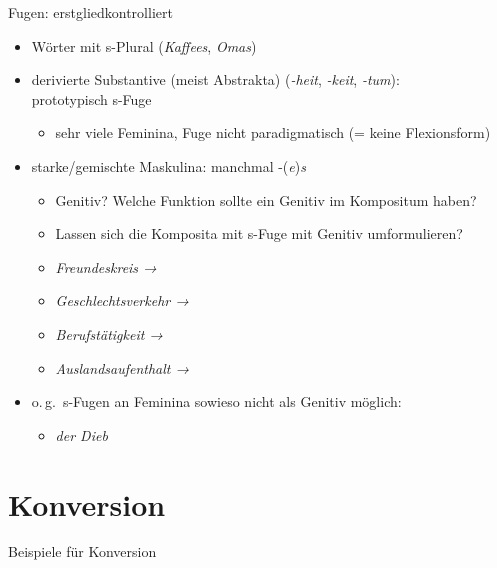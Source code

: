 \begin{frame}
  {Fugen: erstgliedkontrolliert}
  \pause
  \begin{itemize}[<+->]
    \item Wörter mit s-Plural (\textit{Kaffees}, \textit{Omas}) 
      \Halbzeile
    \item \alert{derivierte} Substantive (meist Abstrakta) (\textit{-heit}, \textit{-keit}, \textit{-tum}):\\
      \alert{prototypisch s-Fuge}
      \begin{itemize}[<+->]
        \item sehr viele Feminina, Fuge nicht paradigmatisch (= keine Flexionsform)
      \end{itemize}
      \Halbzeile
    \item starke\slash gemischte Maskulina: manchmal -(\textit{e})\textit{s}
      \begin{itemize}[<+->]
        \item Genitiv? Welche Funktion sollte ein Genitiv im Kompositum haben?
        \item Lassen sich die Komposita mit s-Fuge mit Genitiv umformulieren?
        \item \textit{Freundeskreis → }
        \item \textit{Geschlechtsverkehr → }
        \item \textit{Berufstätigkeit → }
        \item \textit{Auslandsaufenthalt → }
      \end{itemize}
    \Halbzeile
  \item o.\,g.\ s-Fugen an \alert{Feminina} sowieso nicht als Genitiv möglich:
      \begin{itemize}
        \item \textit{der Dieb }
      \end{itemize}
  \end{itemize}
\end{frame}

\section{Konversion}

\begin{frame}
  {Beispiele für Konversion}
  \pause
  \begin{exe}
    \pause
    \pause
    \pause
    \pause
    \pause
    \pause
    \pause
  \end{exe}
\end{frame}

